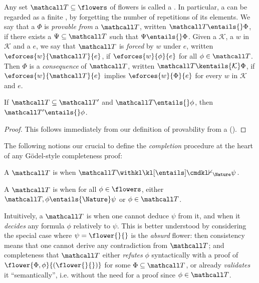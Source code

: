 \begin{scope}
\begin{definition}[Theory] 
  Any set $\tT \subseteq \flowers$ of flowers is called a . In
  particular, a  can be regarded as a finite , by forgetting the
  number of repetitions of its elements. We say that a  $\Phi$ is
  \emph{provable from} a  $\tT$, written $\tT \entails{} \Phi$, if there exists a
   $\Psi \subseteq \tT$ such that $\Psi \entails{} \Phi$. Given a  $\mathcal{K}$, a  $w$ in $\mathcal{K}$ and a 
  $e$, we say that $\tT$ is \emph{forced} by $w$ under $e$, written
  $\eforces{w}{\tT}{e}$, if $\eforces{w}{\phi}{e}$ for all $\phi \in \tT$. Then
  $\Phi$ is a \emph{consequence} of $\tT$, written $\tT \kentails{\mathcal{K}} \Phi$,
  if $\eforces{w}{\tT}{e}$ implies $\eforces{w}{\Phi}{e}$ for every  $w$ in
  $\mathcal{K}$ and  $e$.
\end{definition}

\begin{lemma}[Weakening]
  If $\tT \subseteq \tT'$ and $\tT \entails{} \phi$, then $\tT' \entails{} \phi$.
\end{lemma}
\begin{proof}
  This follows immediately from our definition of provability from a 
  ().
\end{proof}

The following notions our crucial to define the \emph{completion} procedure at
the heart of any Gödel-style completeness proof:

\begin{definition}
  A  $\tT$ is \intro*\consistent{\psi} when $\tT \nentails{\Nature} \psi$.
\end{definition}

\begin{definition}
  A  $\tT$ is \intro*\complete{\psi} when for all $\phi \in \flowers$,
  either $\tT, \phi \entails{\Nature} \psi$ or $\phi \in \tT$.
\end{definition}

Intuitively, a  $\tT$ is \consistent{\psi} when one cannot deduce $\psi$
from it, and \complete{\psi} when it \emph{decides} any formula $\phi$
relatively to $\psi$. This is better understood by considering the special case
where $\psi = \flower{{}}{{}}$ is the \emph{absurd} flower: then consistency
means that one cannot derive any contradiction from $\tT$; and completeness that
$\tT$ either \emph{refutes} $\phi$ syntactically with a proof of $\flower{\Phi,
\phi}{(\flower{}{})}$ for some $\Phi \subseteq \tT$, or already \emph{validates}
it ``semantically'', i.e. without the need for a proof since $\phi \in \tT$.


\end{scope}
